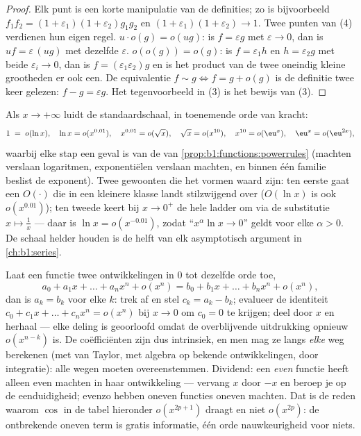 \begin{proof}
Elk punt is een korte manipulatie van de definities; zo is
bijvoorbeeld $f_1 f_2 = (1+\varepsilon_1)(1+\varepsilon_2) g_1
g_2$ en $(1 + \varepsilon_1)(1+\varepsilon_2) \to 1$. Twee punten
van (4) verdienen hun eigen regel. $u\cdot o(g) = o(ug)$: is $f =
\varepsilon g$ met $\varepsilon \to 0$, dan is $uf =
\varepsilon\,(ug)$ met dezelfde $\varepsilon$. $o(o(g)) = o(g)$:
is $f = \varepsilon_1 h$ en $h = \varepsilon_2 g$ met beide
$\varepsilon_i \to 0$, dan is $f = (\varepsilon_1\varepsilon_2) g$
en is het product van de twee oneindig kleine grootheden er ook
een. De equivalentie $f \sim g \iff f = g + o(g)$ is de definitie
twee keer gelezen: $f - g = \varepsilon g$. Het tegenvoorbeeld in
(3) is het bewijs van (3).
\end{proof}

\begin{example}[De vergelijkingsschaal]\label{ex:b1:taylor:scale}
Als $x \to +\infty$ luidt de standaardschaal, in toenemende orde
van kracht:
\[
1 \;=\; o(\ln x), \quad
\ln x = o(x^{0.01}), \quad
x^{0.01} = o(\sqrt x), \quad
\sqrt x = o(x^{10}), \quad
x^{10} = o(\eu^{x}), \quad
\eu^x = o(\eu^{2x}) ,
\]
waarbij elke stap een geval is van de  van
\cref{prop:b1:functions:powerrules} (machten verslaan logaritmen,
exponentiëlen verslaan machten, en binnen één familie beslist de
exponent). Twee gewoonten die het vormen waard zijn: ten eerste
gaat een $O(\cdot)$ die in een kleinere klasse landt stilzwijgend
over ($O(\ln x)$ is ook $o(x^{0.01})$); ten tweede keert bij $x
\to 0^+$ de hele ladder om via de substitutie $x \mapsto \frac1x$
--- daar is $\ln x = o(x^{-0.01})$, zodat ``$x^\alpha \ln x \to
0$'' geldt voor elke $\alpha > 0$. De schaal helder houden is de
helft van elk asymptotisch argument in \cref{ch:b1:series}.
\end{example}

\begin{example}\label{ex:b1:taylor:uniqueness}
Laat een functie twee ontwikkelingen in $0$ tot dezelfde orde toe,
\[
a_0 + a_1 x + \dots + a_n x^n + o(x^n)
= b_0 + b_1 x + \dots + b_n x^n + o(x^n),
\]
dan is $a_k = b_k$ voor elke $k$: trek af en stel $c_k = a_k -
b_k$; evalueer de identiteit $c_0 + c_1 x + \dots + c_n x^n =
o(x^n)$ bij $x \to 0$ om $c_0 = 0$ te krijgen; deel door $x$ en
herhaal --- elke deling is geoorloofd omdat de overblijvende
uitdrukking opnieuw $o(x^{n-k})$ is. De coëfficiënten zijn dus
intrinsiek, en men mag ze langs \emph{elke} weg berekenen (met
 van Taylor, met algebra op bekende ontwikkelingen, door
integratie): alle wegen moeten overeenstemmen. Dividend: een
\emph{even} functie heeft alleen even machten in haar
ontwikkeling --- vervang $x$ door $-x$ en beroep je op de
eenduidigheid; evenzo hebben oneven functies oneven machten. Dat
is de reden waarom $\cos$ in de tabel hieronder $o(x^{2p+1})$
draagt en niet $o(x^{2p})$: de ontbrekende oneven term is gratis
informatie, één orde nauwkeurigheid voor niets.
\end{example}

